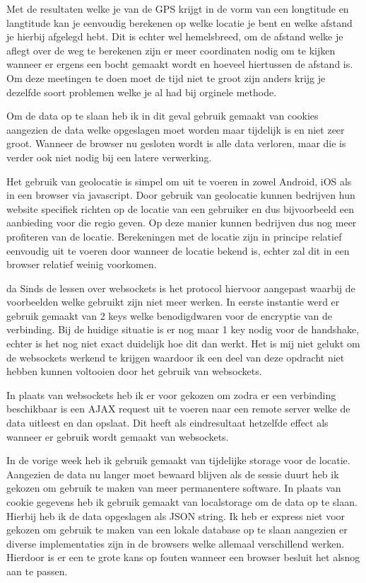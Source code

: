 Met de resultaten welke je van de GPS krijgt in de vorm van een longtitude en langtitude kan je eenvoudig berekenen op welke locatie je bent en welke afstand je hierbij afgelegd hebt. Dit is echter wel hemelsbreed, om de afstand welke je aflegt over de weg te berekenen zijn er meer coordinaten nodig om te kijken wanneer er ergens een bocht gemaakt wordt en hoeveel hiertussen de afstand is. Om deze meetingen te doen moet de tijd niet te groot zijn anders krijg je dezelfde soort problemen welke je al had bij orginele methode.

Om de data op te slaan heb ik in dit geval gebruik gemaakt van cookies aangezien de data welke opgeslagen moet worden maar tijdelijk is en niet zeer groot. Wanneer de browser nu gesloten wordt is alle data verloren, maar die is verder ook niet nodig bij een latere verwerking.

Het gebruik van geolocatie is simpel om uit te voeren in zowel Android, iOS als in een browser via javascript. Door gebruik van geolocatie kunnen bedrijven hun website specifiek richten op de locatie van een gebruiker en dus bijvoorbeeld een aanbieding voor die regio geven. Op deze manier kunnen bedrijven dus nog meer profiteren van de locatie. Berekeningen met de locatie zijn in principe relatief eenvoudig uit te voeren door wanneer de locatie bekend is, echter zal dit in een browser relatief weinig voorkomen.

da
Sinds de lessen over websockets is het protocol hiervoor aangepast waarbij de voorbeelden welke gebruikt zijn niet meer werken. In eerste instantie werd er gebruik gemaakt van 2 keys welke benodigdwaren voor de encryptie van de verbinding. Bij de huidige situatie is er nog maar 1 key nodig voor de handshake, echter is het nog niet exact duidelijk hoe dit dan werkt. Het is mij niet gelukt om de websockets werkend te krijgen waardoor ik een deel van deze opdracht niet hebben kunnen voltooien door het gebruik van websockets.

In plaats van websockets heb ik er voor gekozen om zodra er een verbinding beschikbaar is een AJAX request uit te voeren naar een remote server welke de data uitleest en dan opslaat. Dit heeft als eindresultaat hetzelfde effect als wanneer er gebruik wordt gemaakt van websockets.

In de vorige week heb ik gebruik gemaakt van tijdelijke storage voor de locatie. Aangezien de data nu langer moet bewaard blijven als de sessie duurt heb ik gekozen om gebruik te maken van meer permanentere software. In plaats van cookie gegevens heb ik gebruik gemaakt van localstorage om de data op te slaan. Hierbij heb ik de data opgeslagen als JSON string. Ik heb er express niet voor gekozen om gebruik te maken van een lokale database op te slaan aangezien er diverse implementaties zijn in de browsers welke allemaal verschillend werken. Hierdoor is er een te grote kans op fouten wanneer een browser besluit het alsnog aan te passen.

